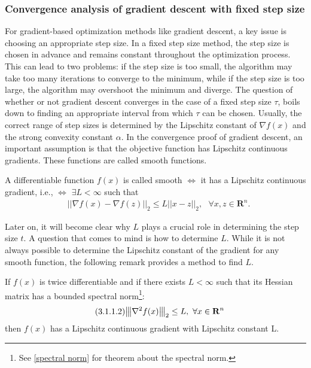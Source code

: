 \subsubsection{Convergence analysis of gradient descent with fixed step size}
For gradient-based optimization methods like gradient descent, a key issue is choosing an appropriate step size. In a fixed step size method, the step size is chosen in advance and remains constant throughout the optimization process. This can lead to two problems: if the step size is too small, the algorithm may take too many iterations to converge to the minimum, while if the step size is too large, the algorithm may overshoot the minimum and diverge. The question of whether or not gradient descent converges in the case of a fixed step size $\tau$, boils down to finding an appropriate interval from which $\tau$ can be chosen. Usually, the correct range of step sizes is determined by the Lipschitz constant of $\nabla f(x)$ and the strong convexity constant $\alpha.$ In the convergence proof of gradient descent, an important assumption is that the objective function has Lipschitz continuous gradients. These functions are called smooth functions.
\begin{definition}
\cite[8]{GDlips}
A differentiable function $f(x)$ is called smooth $\iff$ it has a Lipschitz continuous gradient, i.e., $\iff$ $\exists L < \infty$ such that
\begin{equation*}\label{eq:14}\tag{3.1.1.1}
\begin{aligned}
    &||\nabla f(x) - \nabla f(z)||_{2} \leq L||x-z||_{2},\text{ } \forall x, z \in \mathbf{R}^{n}.
\end{aligned}
\end{equation*}
\end{definition}
Later on, it will become clear why $L$ plays a crucial role in determining the step size $t.$ A question that comes to mind is how to determine $L.$ While it is not always possible to determine the Lipschitz constant of the gradient for any smooth function, the following remark provides a method to find $L.$
\begin{remark}\label{findL}
\cite[10]{GDlips}
If $f(x)$ is twice differentiable and if there exists $L < \infty$ such that its Hessian matrix has a bounded spectral norm\footnote{See \ref{spectral norm} for theorem about the spectral norm.}:
\begin{equation*}\label{eq:15}\tag{3.1.1.2}
\begin{aligned}
    &{\left\vert\kern-0.25ex\left\vert\kern-0.25ex\left\vert \nabla^{2} f(x) \right\vert\kern-0.25ex\right\vert\kern-0.25ex\right\vert}_{2} \leq L,\text{ } \forall x \in \mathbf{R}^{n}
\end{aligned}
\end{equation*}
then $f(x)$ has a Lipschitz continuous gradient with Lipschitz constant L. 
\end{remark}
